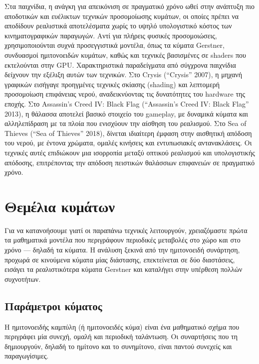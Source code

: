 \documentclass[a4paper, 11pt]{article}
\begin{document}
Στα παιχνίδια, η ανάγκη για απεικόνιση σε πραγματικό χρόνο ωθεί στην
ανάπτυξη πιο αποδοτικών και ευέλικτων τεχνικών προσομοίωσης κυμάτων, οι
οποίες πρέπει να αποδίδουν ρεαλιστικά αποτελέσματα χωρίς το υψηλό
υπολογιστικό κόστος των κινηματογραφικών παραγωγών. Αντί για πλήρεις
φυσικές προσομοιώσεις, χρησιμοποιούνται συχνά προσεγγιστικά μοντέλα,
όπως τα κύματα Gerstner, συνδυασμοί ημιτονοειδών κυμάτων, καθώς και
τεχνικές βασισμένες σε shaders που εκτελούνται στην GPU. Χαρακτηριστικά
παραδείγματα από σύγχρονα παιχνίδια δείχνουν την εξέλιξη αυτών των
τεχνικών. Στο Crysis ({``Crysis''} 2007), η μηχανή γραφικών εισήγαγε
προηγμένες τεχνικές σκίασης (shading) και λεπτομερή προσομοίωση
επιφάνειας νερού, αναδεικνύοντας τις δυνατότητες του hardware της
εποχής. Στο Assassin's Creed IV: Black Flag ({``Assassin's Creed IV:
Black Flag''} 2013), η θάλασσα αποτελεί βασικό στοιχείο του gameplay, με
δυναμικά κύματα και αλληλεπίδραση με τα πλοία που ενισχύουν την αίσθηση
του ρεαλισμού. Στο Sea of Thieves ({``Sea of Thieves''} 2018), δίνεται
ιδιαίτερη έμφαση στην αισθητική απόδοση του νερού, με έντονα χρώματα,
ομαλές κινήσεις και εντυπωσιακές αντανακλάσεις. Οι τεχνικές αυτές
επιδιώκουν μια ισορροπία μεταξύ οπτικού ρεαλισμού και υπολογιστικής
απόδοσης, επιτρέποντας την απόδοση πειστικών θαλάσσιων επιφανειών σε
πραγματικό χρόνο.

\section{Θεμέλια
κυμάτων}\label{ux3b8ux3b5ux3bcux3adux3bbux3b9ux3b1-ux3baux3c5ux3bcux3acux3c4ux3c9ux3bd}

Για να κατανοήσουμε γιατί οι παραπάνω τεχνικές λειτουργούν, χρειαζόμαστε
πρώτα τα μαθηματικά μοντέλα που περιγράφουν περιοδικές μεταβολές στο
χώρο και στο χρόνο --- δηλαδή τα κύματα. Η ανάλυση ξεκινά από την
ημιτονοειδή συνάρτηση, προχωρά σε κινούμενα κύματα μίας διάστασης,
επεκτείνεται σε δύο διαστάσεις, εισάγει τα ρεαλιστικότερα κύματα
Gerstner και καταλήγει στην υπέρθεση πολλών συχνοτήτων.

\subsection{Παράμετροι
κύματος}\label{ux3c0ux3b1ux3c1ux3acux3bcux3b5ux3c4ux3c1ux3bfux3b9-ux3baux3cdux3bcux3b1ux3c4ux3bfux3c2}

Η ημιτονοειδής καμπύλη (ή ημιτονοειδές κύμα) είναι ένα μαθηματικό σχήμα
που περιγράφει μία συνεχή, ομαλή και περιοδική ταλάντωση. Οι συναρτήσεις
που τη δημιουργούν, δηλαδή το ημίτονο και το συνημίτονο, είναι παντού
συνεχείς και παραγωγίσιμες.
\end{document}
